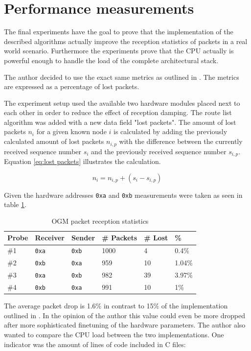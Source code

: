 \section{Performance measurements}%
The final experiments have the goal to prove that the implementation of the described algorithms actually improve the reception statistics of packets in a real world scenario. Furthermore the experiments prove that the CPU actually is powerful enough to handle the load of the complete architectural stack.

The author decided to use the exact same metrics as outlined in \cite{korniowski}. The metrics are expressed as a percentage of lost packets.

The experiment setup used the available two hardware modules placed next to each other in order to reduce the effect of reception damping. The route list algorithm was added with a new data field "lost packets". The amount of lost packets $n_i$ for a given known node $i$ is calculated by adding the previously calculated amount of lost packets $n_{i,p}$ with the difference between the currently received sequence number $s_i$ and the previously received sequence number $s_{i,p}$. Equation \ref{eq:lost packets} illustrates the calculation.

\begin{equation}
\label{eq:lost packets}
n_i = n_{i,p} + (s_i - s_{i,p})
\end{equation}

Given the hardware addresses \texttt{0xa} and \texttt{0xb} measurements were taken as seen in table \ref{tab:probes}.

\begin{table}[H]
\centering
\begin{tabular}{l | l | l | l | l | l}
Probe & Receiver & Sender & \# Packets & \# Lost & \% \\
\hline
\#1 & \texttt{0xa} & \texttt{0xb} & 1000 & 4 & 0.4\% \\
\#2 & \texttt{0xb} & \texttt{0xa} & 959 & 10 & 1.04\% \\
\#3 & \texttt{0xa} & \texttt{0xb} & 982 & 39 & 3.97\% \\
\#4 & \texttt{0xb} & \texttt{0xa} & 991 & 10 & 1\% \\
\end{tabular}
\caption{OGM packet reception statistics}
\label{tab:probes}
\end{table}

The average packet drop is 1.6\% in contrast to 15\% of the implementation outlined in \cite{korniowski}. In the opinion of the author this value could even be more dropped after more sophisticated finetuning of the hardware parameters. The author also wanted to compare the CPU load between the two implementations. One indicator was the amount of lines of code included in C files:

